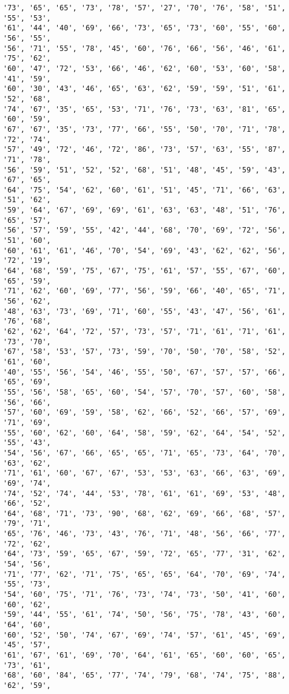 \documentclass[11pt]{article}
\begin{document}
\begin{Verbatim}[commandchars=\\\{\}]
'73', '65', '65', '73', '78', '57', '27', '70', '76', '58', '51', '55', '53',
'61', '44', '40', '69', '66', '73', '65', '73', '60', '55', '60', '56', '55',
'56', '71', '55', '78', '45', '60', '76', '66', '56', '46', '61', '75', '62',
'60', '47', '72', '53', '66', '46', '62', '60', '53', '60', '58', '41', '59',
'60', '30', '43', '46', '65', '63', '62', '59', '59', '51', '61', '52', '68',
'74', '67', '35', '65', '53', '71', '76', '73', '63', '81', '65', '60', '59',
'67', '67', '35', '73', '77', '66', '55', '50', '70', '71', '78', '72', '74',
'57', '49', '72', '46', '72', '86', '73', '57', '63', '55', '87', '71', '78',
'56', '59', '51', '52', '52', '68', '51', '48', '45', '59', '43', '67', '65',
'64', '75', '54', '62', '60', '61', '51', '45', '71', '66', '63', '51', '62',
'59', '64', '67', '69', '69', '61', '63', '63', '48', '51', '76', '65', '57',
'56', '57', '59', '55', '42', '44', '68', '70', '69', '72', '56', '51', '60',
'60', '61', '61', '46', '70', '54', '69', '43', '62', '62', '56', '72', '19',
'64', '68', '59', '75', '67', '75', '61', '57', '55', '67', '60', '65', '59',
'71', '62', '60', '69', '77', '56', '59', '66', '40', '65', '71', '56', '62',
'48', '63', '73', '69', '71', '60', '55', '43', '47', '56', '61', '76', '68',
'62', '62', '64', '72', '57', '73', '57', '71', '61', '71', '61', '73', '70',
'67', '58', '53', '57', '73', '59', '70', '50', '70', '58', '52', '61', '60',
'40', '55', '56', '54', '46', '55', '50', '67', '57', '57', '66', '65', '69',
'55', '56', '58', '65', '60', '54', '57', '70', '57', '60', '58', '56', '66',
'57', '60', '69', '59', '58', '62', '66', '52', '66', '57', '69', '71', '69',
'55', '60', '62', '60', '64', '58', '59', '62', '64', '54', '52', '55', '43',
'54', '56', '67', '66', '65', '65', '71', '65', '73', '64', '70', '63', '62',
'71', '61', '60', '67', '67', '53', '53', '63', '66', '63', '69', '69', '74',
'74', '52', '74', '44', '53', '78', '61', '61', '69', '53', '48', '66', '52',
'64', '68', '71', '73', '90', '68', '62', '69', '66', '68', '57', '79', '71',
'65', '76', '46', '73', '43', '76', '71', '48', '56', '66', '77', '72', '62',
'64', '73', '59', '65', '67', '59', '72', '65', '77', '31', '62', '54', '56',
'71', '77', '62', '71', '75', '65', '65', '64', '70', '69', '74', '55', '73',
'54', '60', '75', '71', '76', '73', '74', '73', '50', '41', '60', '60', '62',
'59', '44', '55', '61', '74', '50', '56', '75', '78', '43', '60', '64', '60',
'60', '52', '50', '74', '67', '69', '74', '57', '61', '45', '69', '45', '57',
'61', '67', '61', '69', '70', '64', '61', '65', '60', '60', '65', '73', '61',
'68', '60', '84', '65', '77', '74', '79', '68', '74', '75', '88', '62', '59',

\end{Verbatim}
\end{document}
